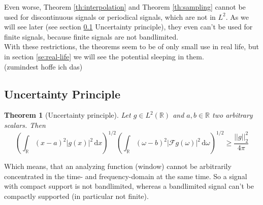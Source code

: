 \documentclass[a4paper, 11pt]{scrreprt}
\newtheorem{theorem}[defi]{Theorem}
\newcommand{\RR}{\mathbb{R}}
\newcommand{\FF}{\mathcal{F}}
\begin{document}
Even worse, Theorem  \ref{th:interpolation} and Theorem \ref{th:sampling} cannot be used for discontinuous signals or periodical signals, which are not in \(L^2\). As we will see later (see section \ref{se:uncertainty} Uncertainty principle), they even can't be used for finite signals, because finite signals are not bandlimited. \\
With these restrictions, the theorems seem to be of only small use in real life, but in section \ref{se:real-life} we will see the potential sleeping in them.\\
(zumindest hoffe ich das)


\subsection{Uncertainty Principle}
\label{se:uncertainty}
\begin{theorem}[Uncertainty principle]
Let \(g\in L^2(\RR) \) and \(a,b \in\RR\) two arbitrary scalars. Then
\begin{equation}
\label{eq:uncertainty}
\left(\int_{\RR} (x-a)^2|g(x)|^2 \,\mathrm{d}x\right)^{1/2}\left(\int_{\RR}(\omega-b)^2|\FF g(\omega)|^2\,\mathrm{d}\omega\right)^{1/2} \geq \frac{||g||_2^2}{4\pi}
\end{equation}
\end{theorem}
Which means, that an analyzing function (window) cannot be arbitrarily concentrated in the time- and frequency-domain at the same time. So a signal with compact support is not bandlimited, whereas a bandlimited signal can't be compactly supported (in particular not finite).\\
\end{document}
